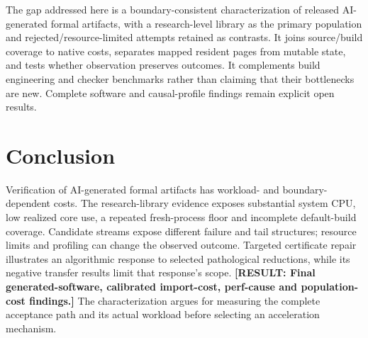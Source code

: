 \documentclass[10pt,twocolumn]{article}
\newcommand{\missing}[1]{\textbf{[RESULT: #1]}}
\begin{document}
The gap addressed here is a boundary-consistent characterization of released
AI-generated formal artifacts, with a research-level library as the primary
population and rejected/resource-limited attempts retained as contrasts.
It joins source/build coverage to native costs, separates mapped resident
pages from mutable state, and tests whether observation preserves outcomes.
It complements build engineering and checker benchmarks rather than claiming
that their bottlenecks are new. Complete software and causal-profile
findings remain explicit open results.
\section{Conclusion}
Verification of AI-generated formal artifacts has workload- and
boundary-dependent costs.
The research-library evidence exposes substantial system CPU, low realized
core use, a repeated fresh-process floor and incomplete default-build
coverage. Candidate streams expose different failure and tail structures;
resource limits and profiling can change the observed outcome.
Targeted certificate repair illustrates an algorithmic response to selected
pathological reductions, while its negative transfer results limit that
response's scope.
\missing{Final generated-software, calibrated import-cost, perf-cause and
population-cost findings.}
The characterization argues for measuring the complete acceptance path and
its actual workload before selecting an acceleration mechanism.



\end{document}
